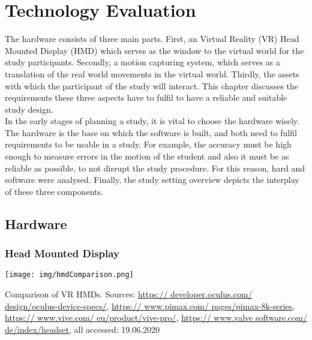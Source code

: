 \chapter{Technology Evaluation}
The hardware consists of three main parts. First, an Virtual Reality (VR) Head Mounted Display (HMD) which serves as the window to the virtual world for the study participants. Secondly, a motion capturing system, which serves as a translation of the real world movements in the virtual world. Thirdly, the assets with which the participant of the study will interact. This chapter discusses the requirements these three aspects have to fulfil to have a reliable and suitable study design.\\ 
In the early stages of planning a study, it is vital to choose the hardware wisely. The hardware is the base on which the software is built, and both need to fulfil requirements to be usable in a study. For example, the accuracy must be high enough to measure errors in the motion of the student and also it must be as reliable as possible, to not disrupt the study procedure. For this reason, hard and software were analysed. Finally, the study setting overview depicts the interplay of these three components.

\section{Hardware}
\subsection{Head Mounted Display}
\begin{table}
	\centering
	\texttt{[image: img/hmdComparison.png]}
	\caption{Comparison of VR HMDs. Sources: \href{https://developer.oculus.com/design/oculus-device-specs/}{https:// developer.oculus.com/ design/oculus-device-specs/}, \href{https://www.pimax.com/pages/pimax-8k-series}{https:// www.pimax.com/ pages/pimax-8k-series}, \href{https://www.vive.com/eu/product/vive-pro/}{https:// www.vive.com/ eu/product/vive-pro/}, \href{https://www.valvesoftware.com/de/index/headset}{https:// www.valve software.com/ de/index/headset}, all accessed: 19.06.2020
	}
	\label{fig:hmdComparison}
\end{table}

